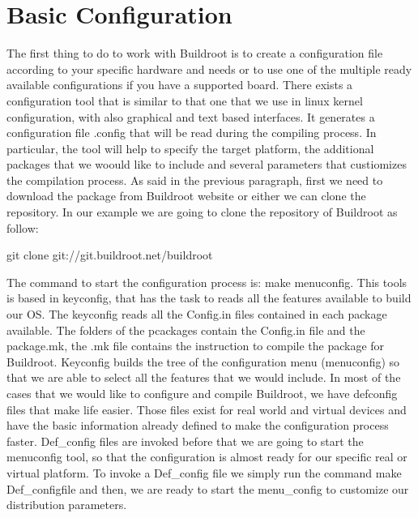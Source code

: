 \documentclass[a4paper,twoside,11pt]{article}
\begin{document}
\section{Basic Configuration}
The first thing to do to work with Buildroot is to create a configuration file according to your specific hardware and needs or to use one of the multiple ready available configurations if you have a supported board.
There exists a configuration tool that is similar to that one that we use in linux kernel configuration, with also graphical and text based interfaces.
It generates a configuration file .config that will be read during the compiling process.
In particular, the tool will help to specify the target platform, the additional packages that we woould like to include and several parameters that custiomizes the compilation process.
As said in the previous paragraph, first we need to download the package from Buildroot website or either we can clone the repository.
In our example we are going to clone the repository  of Buildroot as follow:

git clone git://git.buildroot.net/buildroot

The command to start the configuration process is: 
make menuconfig.
This tools is based in keyconfig, that has the task to reads all the features available to build our OS.
The keyconfig reads all the Config.in files contained in each package available.
The folders of the pcackages contain the Config.in file and the package.mk, the .mk file contains the instruction to compile the package for Buildroot.
Keyconfig builds the tree of the configuration menu (menuconfig) so that we are able to select all the features that we would include.
In most of the cases that we would like to configure and compile Buildroot, we have defconfig files that make life easier.
Those files exist for real world and virtual devices and have the basic information already defined to make the configuration process faster.
Def\_config files are invoked before that we are going to start the menuconfig tool, so that the configuration is almost ready for our specific real or virtual platform.
To invoke a Def\_config file we simply run the command
make Def\_configfile
and then, we are ready to start the menu\_config to customize our distribution parameters.
\end{document}
